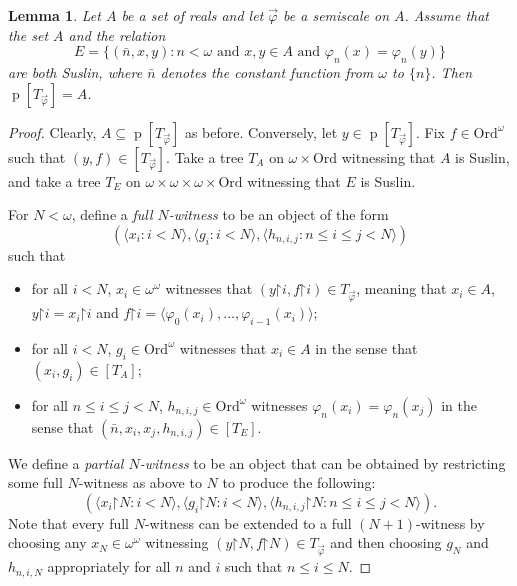 \documentclass[fleqn, 11pt]{amsart}
\theoremstyle{plain}
\newtheorem{lem}[thm]{Lemma} \newtheorem*{lem*}{Lemma}
\theoremstyle{definition}
\theoremstyle{remark}
\newcommand{\Ord}{\mathrm{Ord}}
\newcommand{\restrict}{\mathord{\restriction}}
\DeclareMathOperator{\p}{p}
\begin{document}
\begin{lem}
 Let $A$ be a set of reals and let $\vec{\varphi}$ be a semiscale on $A$.
 Assume that the set $A$ and the relation 
 \[E = \{(\bar{n}, x, y) : n < \omega \text{ and } x,y \in A \text{ and } \varphi_n(x) = \varphi_n(y)\}\]
 are both Suslin, where $\bar{n}$ denotes the constant function from $\omega$ to $\{n\}$.   Then $\p[T_{\vec{\varphi}}] = A$.
\end{lem}

\begin{proof}
Clearly, $A \subseteq \p[T_{\vec{\varphi}}]$ as before.
Conversely, let $y \in \p[T_{\vec{\varphi}}]$.
Fix $f \in \Ord^\omega$ such that $(y,f) \in [T_{\vec{\varphi}}]$.
 Take a tree $T_A$ on $\omega \times \Ord$ witnessing that $A$ is Suslin, and take a tree $T_E$ on $\omega \times \omega \times \omega \times \Ord$ witnessing that $E$ is Suslin.

For $N < \omega$, define a \emph{full $N$-witness} to be an object of the form
\[ ( \langle x_i : i < N\rangle, \langle g_i : i < N\rangle, \langle h_{n,i,j} : n \le i \le j < N\rangle)\]
such that
\begin{itemize}
 \item for all $i < N$, $x_i \in \omega^\omega$ witnesses that $(y \restrict i,f \restrict i) \in T_{\vec{\varphi}}$,
meaning that $x_i \in A$, $y \restrict i = x_i \restrict i$ and 
 $f \restrict i = \langle \varphi_0(x_i),\ldots,\varphi_{i-1}(x_i)\rangle$;

 \item for all $i < N$, $g_i \in \Ord^\omega$ witnesses that $x_i \in A$ in the sense that $(x_i,g_i) \in [T_A]$;

 \item for all $n \le i \le j < N$, $h_{n,i,j} \in \Ord^\omega$ witnesses $\varphi_n(x_i) = \varphi_n(x_j)$ in the sense that $(\bar{n}, x_i, x_j, h_{n,i,j}) \in [T_E]$.
\end{itemize}
We define a \emph{partial $N$-witness} to be an object 
that can be obtained by restricting some full $N$-witness as above to $N$ to produce the following:
\[ ( \langle x_i \restrict N : i < N\rangle, \langle g_i \restrict N: i < N\rangle, \langle h_{n,i,j} \restrict N: n \le i \le j < N\rangle).\]
Note that every full $N$-witness can be extended to a full $(N+1)$-witness
by choosing any $x_N \in \omega^\omega$ witnessing $(y \restrict N,f \restrict N) \in T_{\vec{\varphi}}$
and then choosing $g_N$ and $h_{n,i,N}$ appropriately for all $n$ and $i$
such that $n \le i \le N$.


\end{proof}
\end{document}
